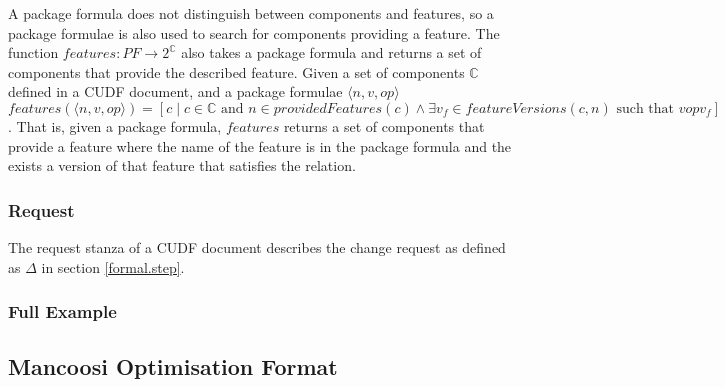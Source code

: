 A package formula does not distinguish between components and features, so a package formulae is also used to search for components providing a feature.
The function $features: PF \rightarrow 2^{\mathbb{C}}$ also takes a package formula and returns a set of components that provide the described feature.
Given a set of components $\mathbb{C}$ defined in a CUDF document, and a package formulae $\langle n,v,op\rangle$
$features(\langle n,v,op\rangle) = [c \mid c\in \mathbb{C} \mbox{ and } n \in providedFeatures(c) \wedge \exists v_f \in featureVersions(c,n) \mbox { such that } v op v_f ]$.
That is, given a package formula, 
$features$ returns a set of components that provide a feature where the name of the feature is in the package formula and the exists a version of that feature that satisfies the relation. 


\subsubsection{Request}
The request stanza of a CUDF document describes the change request as defined as $\Delta$ in section \ref{formal.step}.

\subsubsection{Full Example}



\subsection{Mancoosi Optimisation Format}

